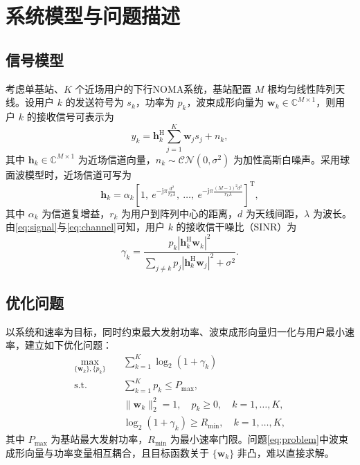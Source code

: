 \documentclass[UTF8, a4paper, zihao=-4, fontset=windows]{ctexart}
\theoremstyle{plain}
\theoremstyle{definition}
\theoremstyle{plain}
\begin{document}
\section{系统模型与问题描述}\label{sec:model}

\subsection{信号模型}\label{sec:signal}

考虑单基站、$K$ 个近场用户的下行NOMA系统，基站配置 $M$ 根均匀线性阵列天线。设用户 $k$ 的发送符号为 $s_k$，功率为 $p_k$，波束成形向量为 $\mathbf{w}_k\in\mathbb{C}^{M\times 1}$，则用户 $k$ 的接收信号可表示为
\begin{equation}
y_k = \mathbf{h}_k^{\mathrm{H}}\sum_{j=1}^{K}\mathbf{w}_j s_j + n_k,
\label{eq:signal}
\end{equation}
其中 $\mathbf{h}_k\in\mathbb{C}^{M\times 1}$ 为近场信道向量，$n_k\sim\mathcal{CN}(0,\sigma^2)$ 为加性高斯白噪声。采用球面波模型时，近场信道可写为
\begin{equation}
\mathbf{h}_k = \alpha_k\left[1,\ e^{-\mathrm{j}\pi\frac{d^2}{r_k\lambda}},\ \ldots,\ e^{-\mathrm{j}\pi\frac{(M-1)^2d^2}{r_k\lambda}}\right]^{\mathrm{T}},
\label{eq:channel}
\end{equation}
其中 $\alpha_k$ 为信道复增益，$r_k$ 为用户到阵列中心的距离，$d$ 为天线间距，$\lambda$ 为波长。由\eqref{eq:signal}与\eqref{eq:channel}可知，用户 $k$ 的接收信干噪比（SINR）为
\begin{equation}
\gamma_k = \frac{p_k\left|\mathbf{h}_k^{\mathrm{H}}\mathbf{w}_k\right|^2}
{\sum_{j\neq k}p_j\left|\mathbf{h}_k^{\mathrm{H}}\mathbf{w}_j\right|^2+\sigma^2}.
\label{eq:sinr}
\end{equation}

\subsection{优化问题}\label{sec:problem}

以系统和速率为目标，同时约束最大发射功率、波束成形向量归一化与用户最小速率，建立如下优化问题：
\begin{equation}
\begin{aligned}
\max_{\{\mathbf{w}_k\},\{p_k\}}\quad & \sum_{k=1}^{K}\log_2\left(1+\gamma_k\right)\\
\text{s.t.}\quad & \sum_{k=1}^{K}p_k\le P_{\max},\\
& \|\mathbf{w}_k\|_2^2=1,\quad p_k\ge 0,\quad k=1,\ldots,K,\\
& \log_2\left(1+\gamma_k\right)\ge R_{\min},\quad k=1,\ldots,K,
\end{aligned}
\label{eq:problem}
\end{equation}
其中 $P_{\max}$ 为基站最大发射功率，$R_{\min}$ 为最小速率门限。问题\eqref{eq:problem}中波束成形向量与功率变量相互耦合，且目标函数关于 $\{\mathbf{w}_k\}$ 非凸，难以直接求解。
\end{document}
